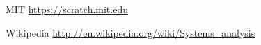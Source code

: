 \begin{thebibliography}{99999}
\singlespace\normalsize

 MIT \url{https://scratch.mit.edu}

 Wikipedia \url{http://en.wikipedia.org/wiki/Systems_analysis}

\end{thebibliography}
